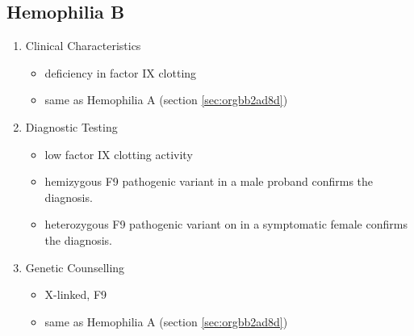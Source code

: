 \documentclass[12pt]{scrartcl}
\begin{document}
\subsection{Hemophilia B}
\label{sec:org9824bcc}
\begin{enumerate}
\item Clinical Characteristics
\label{sec:org2eb54be}
\begin{itemize}
\item deficiency in factor IX clotting
\item same as Hemophilia A (section \ref{sec:orgbb2ad8d})
\end{itemize}
\item Diagnostic Testing
\label{sec:orgf4b3c94}
\begin{itemize}
\item low factor IX clotting activity
\item hemizygous F9 pathogenic variant in a male proband confirms the
diagnosis.
\item heterozygous F9 pathogenic variant on in a symptomatic female
confirms the diagnosis.
\end{itemize}
\item Genetic Counselling
\label{sec:orgade526a}
\begin{itemize}
\item X-linked, F9
\item same as Hemophilia A (section \ref{sec:orgbb2ad8d})
\end{itemize}
\end{enumerate}
\end{document}
